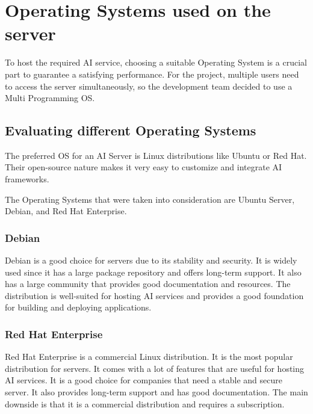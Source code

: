 \cite{TypesOfOs}

\section {Operating Systems used on the server}

To host the required AI service, choosing a suitable Operating System is a crucial part to guarantee a satisfying performance.
For the project, multiple users need to access the server simultaneously, so the development team decided to use a Multi Programming OS.

\subsection {Evaluating different Operating Systems}

The preferred OS for an AI Server is Linux distributions like Ubuntu or Red Hat.
Their open-source nature makes it very easy to customize and integrate AI frameworks.

The Operating Systems that were taken into consideration are Ubuntu Server, Debian, and Red Hat Enterprise. 

\cite{LinuxPoweredAi}

\subsubsection{Debian}

Debian is a good choice for servers due to its stability and security. It is widely used since it has a large package repository and offers long-term support. It also has a large community that provides good documentation and resources. The distribution is well-suited for hosting AI services and provides a good foundation for building and deploying applications.

\cite{LinuxForServerDebian}

\subsubsection{Red Hat Enterprise}

Red Hat Enterprise is a commercial Linux distribution. It is the most popular distribution for servers. It comes with a lot of features that are useful for hosting AI services. It is a good choice for companies that need a stable and secure server. It also provides long-term support and has good documentation.
The main downside is that it is a commercial distribution and requires a subscription.

